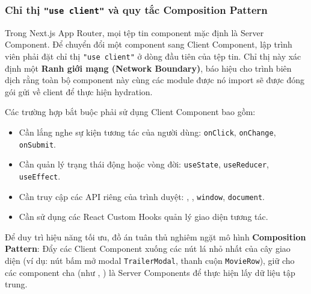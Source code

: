 \documentclass[12pt,a4paper]{extarticle}
\begin{document}
\subsubsection{Chỉ thị \texttt{"use client"} và quy tắc Composition Pattern}
Trong Next.js App Router, mọi tệp tin component mặc định là Server Component. Để chuyển đổi một component sang Client Component, lập trình viên phải đặt chỉ thị \texttt{"use client"} ở dòng đầu tiên của tệp tin. Chỉ thị này xác định một \textbf{Ranh giới mạng (Network Boundary)}, báo hiệu cho trình biên dịch rằng toàn bộ component này cùng các module được nó import sẽ được đóng gói gửi về client để thực hiện hydration.

Các trường hợp bắt buộc phải sử dụng Client Component bao gồm:
\begin{itemize}[noitemsep]
    \item Cần lắng nghe sự kiện tương tác của người dùng: \texttt{onClick}, \texttt{onChange}, \texttt{onSubmit}.
    \item Cần quản lý trạng thái động hoặc vòng đời: \texttt{useState}, \texttt{useReducer}, \texttt{useEffect}.
    \item Cần truy cập các API riêng của trình duyệt: , , \texttt{window}, \texttt{document}.
    \item Cần sử dụng các React Custom Hooks quản lý giao diện tương tác.
\end{itemize}

Để duy trì hiệu năng tối ưu, đồ án tuân thủ nghiêm ngặt mô hình \textbf{Composition Pattern}: Đẩy các Client Component xuống các nút lá nhỏ nhất của cây giao diện (ví dụ: nút bấm mở modal \texttt{TrailerModal}, thanh cuộn \texttt{MovieRow}), giữ cho các component cha (như , ) là Server Components để thực hiện lấy dữ liệu tập trung.
\end{document}
